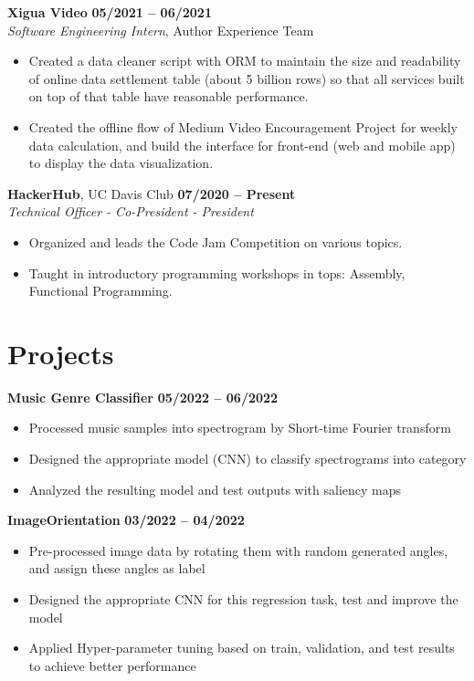 \documentclass[margin,line]{res}
\begin{document}
\begin{resume}
\vspace{-.3cm}

{\bf Xigua Video} \hfill {\bf 05/2021 -- 06/2021} \\
\textit{Software Engineering Intern}, {Author Experience Team}
\begin{itemize}
	\item Created a data cleaner script with ORM to maintain the size and readability of online data settlement table (about 5 billion rows) so that all services built on top of that table have reasonable performance.
	\item Created the offline flow of Medium Video Encouragement Project for weekly data calculation, and build the interface for front-end (web and mobile app) to display the data visualization.
\end{itemize}
\vspace{-.3cm}

{\bf HackerHub}, UC Davis Club \hfill {\bf 07/2020 -- Present} \\
\textit{Technical Officer - Co-President - President}
\begin{itemize}
	\item Organized and leads the Code Jam Competition on various topics.
	\item Taught in introductory programming workshops in tops: Assembly, Functional Programming.
\end{itemize}
\vspace{-.3cm}

\section{\sc Projects}
{\bf Music Genre Classifier} \hfill {\bf 05/2022 -- 06/2022} \\
\vspace{-.3cm}
\begin{itemize}
	\item Processed music samples into spectrogram by Short-time Fourier transform
	\item Designed the appropriate model (CNN) to classify spectrograms into category
	\item Analyzed the resulting model and test outputs with saliency maps
\end{itemize}
\vspace{-.3cm}

{\bf ImageOrientation} \hfill {\bf 03/2022 -- 04/2022} \\
\vspace{-.3cm}
\begin{itemize}
	\item Pre-processed image data by rotating them with random generated angles, and assign these angles as label
	\item Designed the appropriate CNN for this regression task, test and improve the model
	\item Applied Hyper-parameter tuning based on train, validation, and test results to achieve better performance
\end{itemize}
\vspace{-.3cm}


\end{resume}
\end{document}
